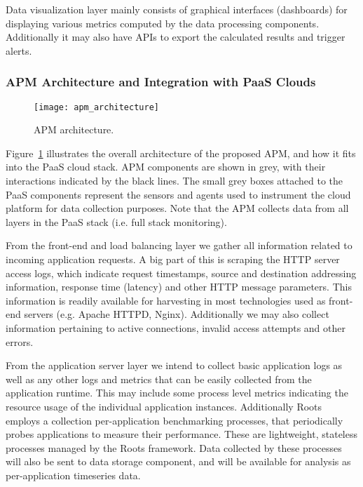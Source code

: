 Data visualization layer mainly consists of graphical interfaces (dashboards) for displaying various
metrics computed by the data processing components. Additionally it may also have APIs to export
the calculated results and trigger alerts. 

\subsubsection{APM Architecture and Integration with PaaS Clouds}
\begin{figure}
\centering
\texttt{[image: apm\_architecture]}
\caption{APM architecture.}
\label{fig:apm_architecture}
\end{figure}

Figure~\ref{fig:apm_architecture} illustrates the overall architecture of the proposed APM, and how 
it fits into the PaaS cloud stack. APM components are shown in grey, with their interactions indicated
by the black lines. The small grey boxes attached to the PaaS components represent the sensors and
agents used to instrument the cloud platform for data collection purposes. Note that the APM collects
data from all layers in the PaaS stack (i.e. full stack monitoring).

From the front-end and load balancing layer we gather all information related to incoming application
requests. A big part of this is scraping the HTTP server access logs, which indicate request timestamps,
source and destination addressing information, response time (latency) and other HTTP message
parameters. This information is readily available for harvesting in most technologies used as front-end
servers (e.g. Apache HTTPD, Nginx). Additionally we may also collect information pertaining to active
connections, invalid access attempts and other errors.

From the application server layer we intend to collect basic application logs as well as any other logs and 
metrics that can be easily collected from the application runtime. This may include some process level
metrics indicating the resource usage of the individual application instances. Additionally Roots
employs a collection per-application benchmarking processes, that periodically probes applications
to measure their performance. These are lightweight, stateless processes managed by the Roots framework.
Data collected by these processes will also be sent to data storage component, and will be available
for analysis as per-application timeseries data.

